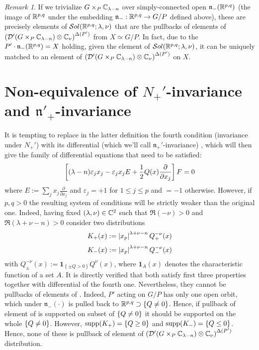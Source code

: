 \documentclass[10pt]{article} %
\newcommand{\D}{\mathcal{D}}
\theoremstyle{definition}
\theoremstyle{remark}
\newtheorem*{remark}{Remark}
\begin{document}
\begin{remark}
	If we trivialize $G\times_P\C_{\lambda-n}$ over simply-connected open $\mathfrak{n}_-(\R^{p,q})$ (the image of $\R^{p,q}$
	under the embedding $\mathfrak{n}_-:\R^{p,q}\to G/P$ defined above),
	these are precisely elements of $\sol[\R^{p,q}]$
	that are the pullbacks of elements of 
	$\mybra{\D'(G\times_P\C_{\lambda-n})\otimes\C_\nu}^{\Delta(P')}$
	from $X\simeq G/P$.
	In fact, due to the $P'\cdot\mathfrak{n}_-(\R^{ p,q })=X$ holding, given the element of $\sol[\R^{p,q}]$,
	it can be uniquely matched to an element of
	$\mybra{\D'(G\times_P\C_{\lambda-n} )\otimes\C_\nu}^{\Delta(P')}$
	on $X$.
\end{remark}
\section{Non-equivalence of $N_+'$-invariance and $\mathfrak{n}'_+$-invariance}
It is tempting to replace in the latter definition
the fourth condition (invariance under $N_+'$) with its differential (which we'll call $\mathfrak{n}_+'$-invariance)
, which will then give the family of differential equations that need to be satisfied:
\begin{equation}
\mysbra{(\lambda-n)\varepsilon_jx_j-\varepsilon_jx_jE+\frac{ 1 }{ 2 }Q(x)\frac{ \partial}{ \partial x_j } }F=0
	\label{Ndiff}
\end{equation}
where $E:=\sum_j x_j\frac{ \partial }{ \partial x_j }$ and $\varepsilon_j=+1$ for $1\leq j\leq p$ and $=-1$ otherwise.
However, if $p,q>0$ the resulting system of conditions will be strictly weaker than the original one. Indeed, having
fixed $(\lambda,\nu)\in\C^2$ such that $\Re(-\nu)>0$ and $\Re(\lambda+\nu-n)>0$ consider two distributions
\[K_+(x):=\myabs{ x_p }^{ \lambda+\nu-n }Q_+^{ -\nu }(x)\]
\[K_-(x):=\myabs{ x_p }^{ \lambda+\nu-n }Q_-^{ -\nu }(x)\]
with $Q^{-\nu}_{\pm}(x):=\mathbf{1}_{\left\{ \pm Q>0 \right\}}Q^{\nu}(x)$, where $\mathbf{1}_A(x)$ denotes the
characteristic function of a set $A$.
It is directly verified that both satisfy first three properties together with differential of the fourth one. Nevertheless,
they cannot be pullbacks of elements of \sone. Indeed, $P'$ acting on $G/P$
has only one open orbit, which under $\mathfrak{n}_-(\cdot)$ is pulled back to $\R^{ p,q }\supset\mycbra{ Q\neq0 }$.
Hence, if pullback of element of \sone is supported on subset of $\mycbra{ Q\neq0 }$
it should be supported on the whole $\mycbra{ Q\neq0 }$. However, $\supp(K_+)=\mycbra{ Q\geq0 }$ and
$\supp(K_-)=\mycbra{ Q\leq0 }$. Hence, none of these is pullback of element of 
$\mybra{\D'(G\times_P\C_{\lambda-n} )\otimes\C_\nu}^{\Delta(P')}$ distribution.
\end{document}
